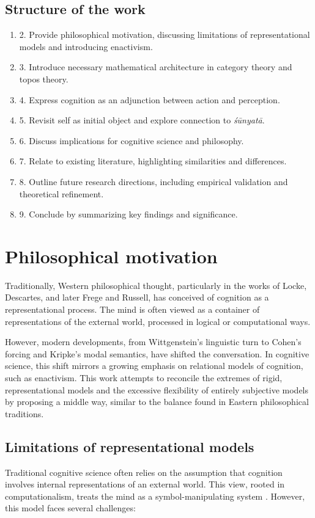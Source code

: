 \documentclass{article}
\begin{document}
\subsection{Structure of the work}
\begin{enumerate}[start=2,label=\S]
    \item 2. Provide philosophical motivation, discussing limitations of representational models and introducing enactivism.
    \item 3. Introduce necessary mathematical architecture in category theory and topos theory.
    \item 4. Express cognition as an adjunction between action and perception.
    \item 5. Revisit self as initial object and explore connection to \emph{śūnyatā}.
    \item 6. Discuss implications for cognitive science and philosophy.
    \item 7. Relate to existing literature, highlighting similarities and differences.
    \item 8. Outline future research directions, including empirical validation and theoretical refinement.
    \item 9. Conclude by summarizing key findings and significance.
\end{enumerate}

\section{Philosophical motivation}
Traditionally, Western philosophical thought, particularly in the works of Locke, Descartes, and later Frege and Russell, has conceived of cognition as a representational process. The mind is often viewed as a container of representations of the external world, processed in logical or computational ways.

However, modern developments, from Wittgenstein’s linguistic turn to Cohen’s forcing and Kripke’s modal semantics, have shifted the conversation. In cognitive science, this shift mirrors a growing emphasis on relational models of cognition, such as enactivism. This work attempts to reconcile the extremes of rigid, representational models and the excessive flexibility of entirely subjective models by proposing a middle way, similar to the balance found in Eastern philosophical traditions.

\subsection{Limitations of representational models}
Traditional cognitive science often relies on the assumption that cognition involves internal representations of an external world. This view, rooted in computationalism, treats the mind as a symbol-manipulating system \cite{fodor1980}. However, this model faces several challenges:
\end{document}

